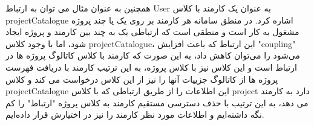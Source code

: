 همچنین به عنوان مثال می توان به ارتباط User به عنوان یک کارمند با کلاس projectCatalogue اشاره کرد. در منطق سامانه هر کارمند بر روی یک یا چند پروژه مشغول به کار است و منطقی است که ارتباطی یک به چند بین کارمند و پروژه ایجاد شود، اما با وجود کلاس projectCatalogue، این ارتباط که باعث افزایش "coupling" می‌شود را می‌توان کاهش داد، به این صورت که کارمند با کلاس کاتالوگ پروژه ها در ارتباط است و این کلاس نیز با کلاس پروژه، به این ترتیب کارمند با دریافت فهرست پروژه ها از کاتالوگ جزییات آنها را نیز از این کلاس درخواست می کند و کلاس projectCatalogue این اطلاعات را از طریق ارتباطی که با کلاس project دارد به کارمند می دهد، به این ترتیب با حذف دسترسی مستقیم کارمند به کلاس پروژه "ارتباط" را کم نگه داشته‌ایم و اطلاعات مورد نظر کارمند را نیز در اختیارش قرار داده‌ایم.




